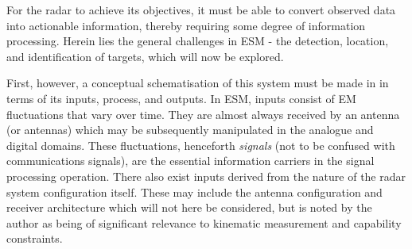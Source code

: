 




For the radar to achieve its objectives, it must be able to convert observed data into actionable information, thereby requiring some degree of information processing. Herein lies the general challenges in \ac{ESM} - the detection, location, and identification of targets, which will now be explored. %

First, however, a conceptual schematisation of this system must be made in in terms of its inputs, process, and outputs. In \ac{ESM}, inputs consist of EM fluctuations that vary over time. They are almost always received by an antenna (or antennas) which may be subsequently manipulated in the analogue and digital domains. These fluctuations, henceforth \textit{signals} (not to be confused with communications signals), are the essential information carriers in the signal processing operation. There also exist inputs derived from the nature of the radar system configuration itself. These may include the antenna configuration and receiver architecture which will not here be considered, but is noted by the author as being of significant relevance to kinematic measurement and capability constraints.

